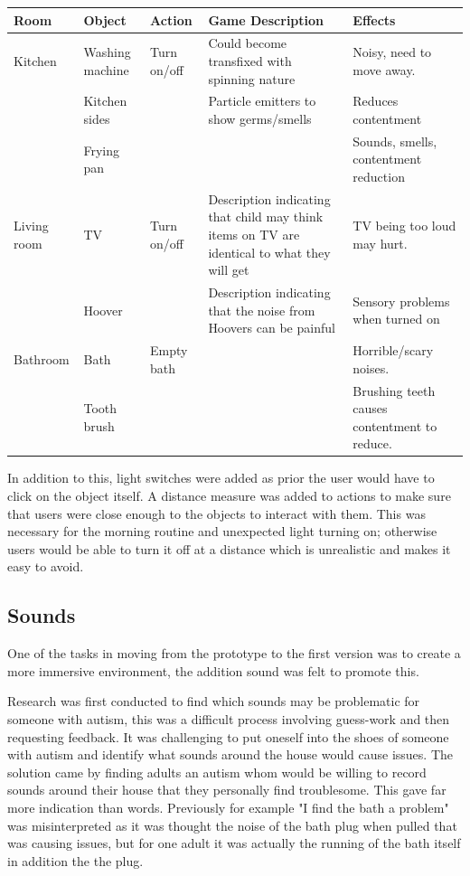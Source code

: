 \begin{table}[H]
    \begin{tabular}{| p{2cm} | p{2cm} | p{3cm} | p{3cm} | p{4cm} | }
    \hline
    Room & Object & Action & Game Description & Effects                                                                  \\
    \hline
    \hline
        Kitchen & Washing machine & Turn on/off & Could become transfixed with spinning nature & Noisy, need to move away. \\
    \hline
    & Kitchen sides & & Particle emitters to show germs/smells & Reduces contentment \\
    \hline
    & Frying pan & & & Sounds, smells, contentment reduction \\
    \hline
    Living room & TV & Turn on/off & Description indicating that child may think items on TV are identical to what they will get & TV being too loud may hurt. \\
    \hline
    & Hoover & & Description indicating that the noise from Hoovers can be painful & Sensory problems when turned on \\
    \hline
    Bathroom & Bath & Empty bath & & Horrible/scary noises. \\
    \hline
    & Tooth brush & & & Brushing teeth causes contentment to reduce. \\
    \hline
    \end{tabular}
\end{table}

In addition to this, light switches were added as prior the user would have to click on the object itself. A distance measure was added to actions to make sure that users were close enough to the objects to interact with them. This was necessary for the morning routine and unexpected light turning on; otherwise users would be able to turn it off at a distance which is unrealistic and makes it easy to avoid.

\subsection{Sounds}
One of the tasks in moving from the prototype to the first version was to create a more immersive environment, the addition sound was felt to promote this.

Research was first conducted to find which sounds may be problematic for someone with autism, this was a difficult process involving guess-work and then requesting feedback. It was challenging to put oneself into the shoes of someone with autism and identify what sounds around the house would cause issues. The solution came by finding adults an autism whom would be willing to record sounds around their house that they personally find troublesome. This gave far more indication than words. Previously for example "I find the bath a problem" was misinterpreted as it was thought the noise of the bath plug when pulled that was causing issues, but for one adult it was actually the running of the bath itself in addition the the plug.

